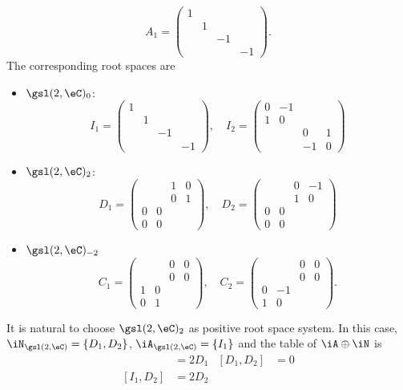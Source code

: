 \[
	A_1=
	\begin{pmatrix}
		1 \\&1\\&&-1\\&&&-1
	\end{pmatrix}.
\]
The corresponding root spaces are
\begin{itemize}
	\item $\gsl(2,\eC)_0$:
	      \[
		      I_1=
		      \begin{pmatrix}
			      1 \\&1\\&&-1\\&&&-1
		      \end{pmatrix},\quad
		      I_2=
		      \begin{pmatrix}
			      0 & -1          \\
			      1 & 0           \\
			        &    & 0  & 1 \\
			        &    & -1 & 0
		      \end{pmatrix}
	      \]
	\item $\gsl(2,\eC)_2$:
	      \[
		      D_1=\begin{pmatrix}
			        &   & 1 & 0 \\
			        &   & 0 & 1 \\
			      0 & 0         \\
			      0 & 0
		      \end{pmatrix},\quad
		      D_2=
		      \begin{pmatrix}
			        &   & 0 & -1 \\
			        &   & 1 & 0  \\
			      0 & 0 &        \\
			      0 & 0 &
		      \end{pmatrix}
	      \]
	\item $\gsl(2,\eC)_{-2}$
	      \[
		      C_1=\begin{pmatrix}
			        &   & 0 & 0 \\
			        &   & 0 & 0 \\
			      1 & 0         \\
			      0 & 1
		      \end{pmatrix},\quad
		      C_2=\begin{pmatrix}
			        &    & 0 & 0 \\
			        &    & 0 & 0 \\
			      0 & -1         \\
			      1 & 0
		      \end{pmatrix}.
	      \]
\end{itemize}
It is natural to choose $\gsl(2,\eC)_2$ as positive root space system. In this case, $\iN_{\gsl(2,\eC)}=\{ D_1,D_2 \}$, $\iA_{\gsl(2,\eC)}=\{ I_1 \}$ and the table of $\iA\oplus\iN$ is
\begin{align}
	[I_1,D_1] & =2D_1 & [D_1,D_2] & =0 \\
	[I_1,D_2] & =2D_2 &
\end{align}

